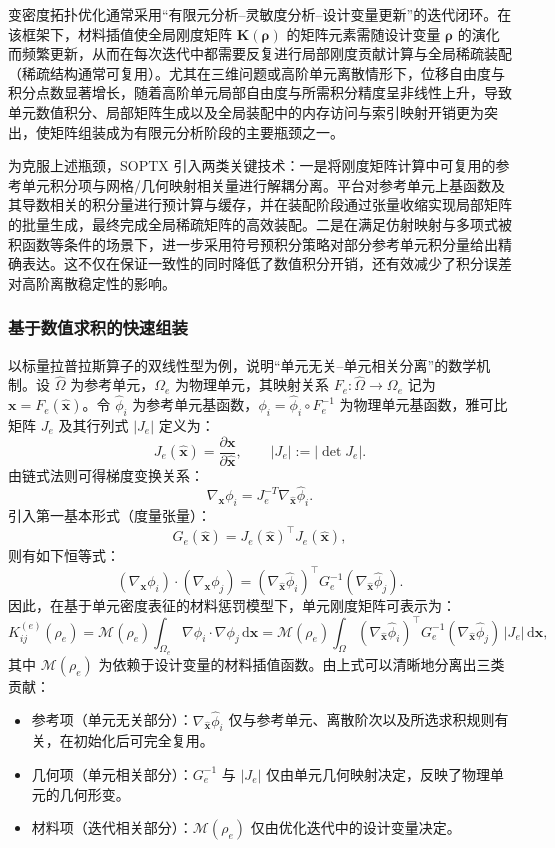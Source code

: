 变密度拓扑优化通常采用“有限元分析--灵敏度分析--设计变量更新”的迭代闭环。在该框架下，材料插值使全局刚度矩阵 $\boldsymbol{K}(\boldsymbol{\rho})$ 的矩阵元素需随设计变量 $\boldsymbol{\rho}$ 的演化而频繁更新，从而在每次迭代中都需要反复进行局部刚度贡献计算与全局稀疏装配（稀疏结构通常可复用）。尤其在三维问题或高阶单元离散情形下，位移自由度与积分点数显著增长，随着高阶单元局部自由度与所需积分精度呈非线性上升，导致单元数值积分、局部矩阵生成以及全局装配中的内存访问与索引映射开销更为突出，使矩阵组装成为有限元分析阶段的主要瓶颈之一。

为克服上述瓶颈，SOPTX 引入两类关键技术：一是将刚度矩阵计算中可复用的参考单元积分项与网格/几何映射相关量进行解耦分离。平台对参考单元上基函数及其导数相关的积分量进行预计算与缓存，并在装配阶段通过张量收缩实现局部矩阵的批量生成，最终完成全局稀疏矩阵的高效装配。二是在满足仿射映射与多项式被积函数等条件的场景下，进一步采用符号预积分策略对部分参考单元积分量给出精确表达。这不仅在保证一致性的同时降低了数值积分开销，还有效减少了积分误差对高阶离散稳定性的影响。

\subsubsection*{基于数值求积的快速组装}

以标量拉普拉斯算子的双线性型为例，说明“单元无关--单元相关分离”的数学机制。设 $\hat{\Omega}$ 为参考单元，$\Omega_e$ 为物理单元，其映射关系 $F_e:\hat{\Omega}\to\Omega_e$ 记为 $\boldsymbol{x}=F_e(\hat{\boldsymbol{x}})$。令 $\hat{\phi}_i$ 为参考单元基函数，$\phi_i=\hat{\phi}_i\circ F_e^{-1}$ 为物理单元基函数，雅可比矩阵 $J_e$ 及其行列式 $|J_e|$ 定义为： 
\[
J_e(\hat{\boldsymbol{x}})=\frac{\partial \boldsymbol{x}}{\partial \hat{\boldsymbol{x}}},\qquad |J_e|:=|\det J_e|.
\]
由链式法则可得梯度变换关系：
\[
\nabla_{\boldsymbol{x}}\phi_i =J_e^{-T}\nabla_{\hat{\boldsymbol{x}}}\hat{\phi}_i.
\]
引入第一基本形式（度量张量）：
\[
G_e(\hat{\boldsymbol{x}})=J_e(\hat{\boldsymbol{x}})^{\top}J_e(\hat{\boldsymbol{x}}),
\]
则有如下恒等式：
\[
(\nabla_{\boldsymbol{x}}\phi_i)\cdot(\nabla_{\boldsymbol{x}}\phi_j) =(\nabla_{\hat{\boldsymbol{x}}}\hat{\phi}_i)^{\top}G_e^{-1}(\nabla_{\hat{\boldsymbol{x}}}\hat{\phi}_j).
\]
因此，在基于单元密度表征的材料惩罚模型下，单元刚度矩阵可表示为：
\[
K^{(e)}_{ij}(\rho_e) = \mathcal{M}(\rho_e) \int_{\Omega_e}\nabla\phi_i\cdot\nabla\phi_j\,\mathrm d\boldsymbol{x} = \mathcal{M}(\rho_e) \int_{\hat{\Omega}}(\nabla_{\hat{\boldsymbol{x}}}\hat{\phi}_i)^{\top}G_e^{-1}(\nabla_{\hat{\boldsymbol{x}}}\hat{\phi}_j)\,|J_e|\,\mathrm d\hat{\boldsymbol{x}},
\]
其中 $\mathcal{M}(\rho_e)$ 为依赖于设计变量的材料插值函数。由上式可以清晰地分离出三类贡献：
\begin{itemize}
	\item 参考项（单元无关部分）：$\nabla_{\hat{\boldsymbol{x}}} \hat{\phi}_i$ 仅与参考单元、离散阶次以及所选求积规则有关，在初始化后可完全复用。
	
	\item 几何项（单元相关部分）：$G_e^{-1}$ 与 $|J_e|$ 仅由单元几何映射决定，反映了物理单元的几何形变。
	
	\item 材料项（迭代相关部分）：$\mathcal{M}(\rho_e)$ 仅由优化迭代中的设计变量决定。
\end{itemize}

